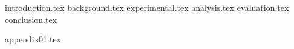 \documentclass[11pt,a4paper]{article}
\numberwithin{figure}{section}
\numberwithin{table}{section}
\begin{document}





\clearpage


\clearpage


\clearpage


\clearpage


\renewcommand{\contentsname}{Table of Contents}
\setcounter{tocdepth}{3}
\tableofcontents
{}
\clearpage

\listoftables
{}
\clearpage

\listoffigures
{}
\clearpage



{introduction.tex}
\clearpage
{background.tex}
\clearpage
{experimental.tex}
\clearpage
{analysis.tex}
\clearpage
{evaluation.tex}
\clearpage
{conclusion.tex}
\clearpage


{appendix01.tex}
\clearpage




\thispagestyle{empty}
\clearpage
\end{document}
